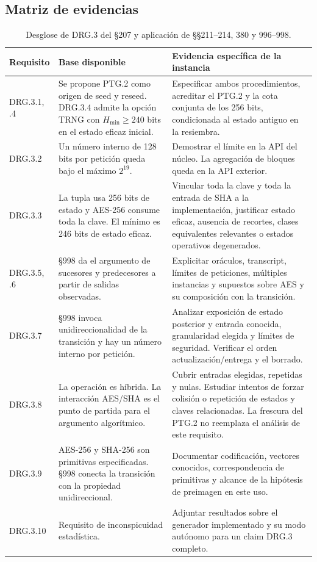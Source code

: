 \documentclass[11pt,a4paper]{article}
\newcommand{\hm}{H_{\min}}
\begin{document}
\subsection{Matriz de evidencias}

\begin{table}[htbp]
\centering\small
\begin{tabularx}{\linewidth}{@{}lYY@{}}
\toprule
Requisito & Base disponible & Evidencia específica de la instancia \\
\midrule
DRG.3.1, .4 & Se propone PTG.2 como origen de seed y reseed.
DRG.3.4 admite la opción TRNG con $\hm\ge240$ bits en el estado eficaz
inicial. & Especificar ambos procedimientos, acreditar el PTG.2 y la
cota conjunta de los 256 bits, condicionada al estado antiguo en la resiembra. \\
DRG.3.2 & Un número interno de 128 bits por petición queda bajo
el máximo $2^{19}$. & Demostrar el límite en la API del núcleo.
La agregación de bloques queda en la API exterior. \\
DRG.3.3 & La tupla usa 256 bits de estado y AES-256 consume toda la clave.
El mínimo es 246 bits de estado eficaz. & Vincular toda la clave y
toda la entrada de SHA a la implementación, justificar estado eficaz,
ausencia de recortes, clases equivalentes relevantes o estados
operativos degenerados. \\
DRG.3.5, .6 & §998 da el argumento de sucesores y predecesores
a partir de salidas observadas. & Explicitar oráculos, transcript,
límites de peticiones, múltiples instancias y supuestos sobre AES y
su composición con la transición. \\
DRG.3.7 & §998 invoca unidireccionalidad de la transición y hay
un número interno por petición. & Analizar exposición de estado
posterior y entrada conocida, granularidad elegida y límites de
seguridad. Verificar el orden actualización/entrega y el borrado. \\
DRG.3.8 & La operación es híbrida. La interacción AES/SHA es el
punto de partida para el argumento algorítmico. & Cubrir entradas
elegidas, repetidas y nulas. Estudiar intentos de forzar colisión
o repetición de estados y claves relacionadas. La frescura del
PTG.2 no reemplaza el análisis de este requisito. \\
DRG.3.9 & AES-256 y SHA-256 son primitivas especificadas.
§998 conecta la transición con la propiedad unidireccional. &
Documentar codificación, vectores conocidos, correspondencia de
primitivas y alcance de la hipótesis de preimagen en este uso. \\
DRG.3.10 & Requisito de inconspicuidad estadística. &
Adjuntar resultados sobre el generador implementado y su modo
autónomo para un claim DRG.3 completo. \\
\bottomrule
\end{tabularx}
\caption{Desglose de DRG.3 del §207 y aplicación de §§211--214, 380 y 996--998.}
\end{table}
\end{document}
